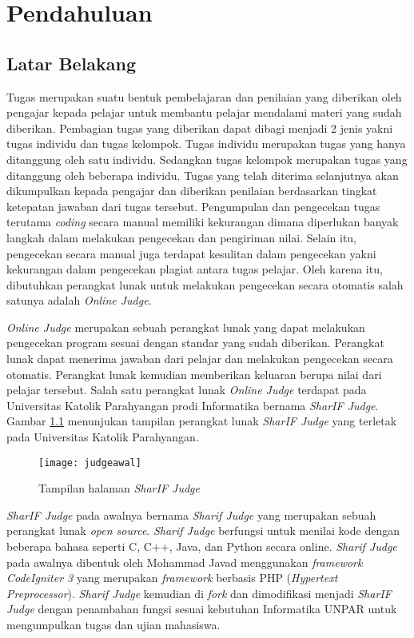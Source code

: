 \chapter{Pendahuluan}
\label{chap:intro}
   
\section{Latar Belakang}
\label{sec:label}

Tugas merupakan suatu bentuk pembelajaran dan penilaian yang diberikan oleh pengajar kepada pelajar untuk membantu pelajar mendalami materi yang sudah diberikan\cite{prihatini:16:plagiarisme}. Pembagian tugas yang diberikan dapat dibagi menjadi 2 jenis yakni tugas individu dan tugas kelompok. Tugas individu merupakan tugas yang hanya ditanggung oleh satu individu. Sedangkan tugas kelompok merupakan tugas yang ditanggung oleh beberapa individu. Tugas yang telah diterima selanjutnya akan dikumpulkan kepada pengajar dan diberikan penilaian berdasarkan tingkat ketepatan jawaban dari tugas tersebut. Pengumpulan dan pengecekan tugas terutama \textit{coding} secara manual memiliki kekurangan dimana diperlukan banyak langkah dalam melakukan pengecekan dan pengiriman nilai. Selain itu, pengecekan secara manual juga terdapat kesulitan dalam pengecekan yakni kekurangan dalam pengecekan plagiat antara tugas pelajar. Oleh karena itu, dibutuhkan perangkat lunak untuk melakukan pengecekan secara otomatis salah satunya adalah \textit{Online Judge}.

\textit{Online Judge} merupakan sebuah perangkat lunak yang dapat melakukan pengecekan program sesuai dengan standar yang sudah diberikan. Perangkat lunak dapat menerima jawaban dari pelajar dan melakukan pengecekan secara otomatis. Perangkat lunak kemudian memberikan keluaran berupa nilai dari pelajar tersebut\cite{kurnia:01:judge}. Salah satu perangkat lunak \textit{Online Judge} terdapat pada Universitas Katolik Parahyangan prodi Informatika bernama \textit{SharIF Judge}. Gambar \ref{fig:judgeawal} menunjukan tampilan perangkat lunak \textit{SharIF Judge} yang terletak pada Universitas Katolik Parahyangan.

\begin{figure}[H]
	\centering  
	\texttt{[image: judgeawal]}  
	\caption[Tampilan halaman \textit{SharIF Judge}]{Tampilan halaman \textit{SharIF Judge}} 
	\label{fig:judgeawal} 
\end{figure} 


\textit{SharIF Judge} pada awalnya bernama \textit{Sharif Judge} yang merupakan sebuah perangkat lunak \textit{open source}. \textit{Sharif Judge} berfungsi untuk menilai kode dengan beberapa bahasa seperti C, C++, Java, dan Python secara online. \textit{Sharif Judge} pada awalnya dibentuk oleh Mohammad Javad menggunakan \textit{framework} \textit{CodeIgniter 3} yang merupakan \textit{framework} berbasis PHP (\textit{Hypertext Preprocessor})\cite{sharif:23}. \textit{Sharif Judge} kemudian di \textit{fork} dan dimodifikasi menjadi \textit{SharIF Judge} dengan penambahan fungsi sesuai kebutuhan Informatika UNPAR untuk mengumpulkan tugas dan ujian mahasiswa\cite{sharif:23}.

